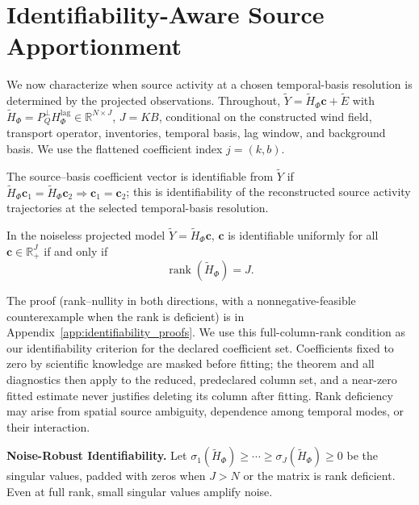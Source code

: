 \section{Identifiability-Aware Source Apportionment}
\label{sec:identifiability_aware_method}
\label{sec:identifiability_theory}

We now characterize when source activity at a chosen temporal-basis resolution
is determined by the projected observations.  Throughout,
\(\widetilde Y=\widetilde H_\Phi\mathbf c+\widetilde E\) with
\(\widetilde H_\Phi=P_Q^\perp H_{\Phi}^{\mathrm{lag}}\in\mathbb R^{N\times J}\),
\(J=KB\), conditional on the constructed wind field, transport operator,
inventories, temporal basis, lag window, and background basis.  We use the
flattened coefficient index \(j=(k,b)\).

\begin{definition}
The source--basis coefficient vector is identifiable from \(\widetilde Y\) if
\(\widetilde H_\Phi\mathbf c_1=\widetilde H_\Phi\mathbf c_2\Longrightarrow
\mathbf c_1=\mathbf c_2\); this is identifiability of the reconstructed source
activity trajectories at the selected temporal-basis resolution.
\end{definition}

\begin{proposition}
\label{prop:rank_identifiability}
In the noiseless projected model \(\widetilde Y=\widetilde H_\Phi\mathbf c\),
\(\mathbf c\) is identifiable uniformly for all
\(\mathbf c\in\mathbb R_+^J\) if and only if
\begin{equation}
\operatorname{rank}(\widetilde H_\Phi)=J.
\label{eq:rank_condition}
\end{equation}
\end{proposition}

The proof (rank--nullity in both directions, with a nonnegative-feasible
counterexample when the rank is deficient) is in
Appendix~\ref{app:identifiability_proofs}.  We use this full-column-rank
condition as our identifiability criterion for the declared coefficient set.  Coefficients fixed to zero by scientific knowledge are masked
before fitting; the theorem and all diagnostics then apply to the reduced,
predeclared column set, and a near-zero fitted estimate never justifies deleting
its column after fitting.  Rank deficiency may arise from spatial source
ambiguity, dependence among temporal modes, or their interaction.

\noindent\textbf{Noise-Robust Identifiability.}
Let \(\sigma_1(\widetilde H_\Phi)\ge\cdots\ge
\sigma_J(\widetilde H_\Phi)\ge0\) be the singular values, padded with zeros when
\(J>N\) or the matrix is rank deficient.  Even at full rank, small singular
values amplify noise.

